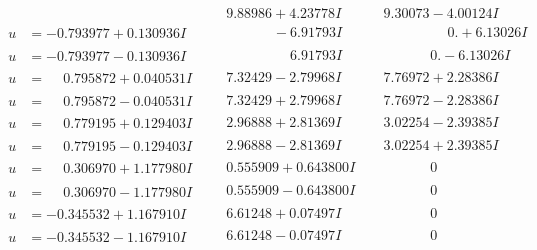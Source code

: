 \documentclass[1p]{elsarticle_modified}
\theoremstyle{definition}
\begin{document}
$$\begin{array}{c|c|c}
 & \phantom{-}9.88986 + 4.23778 I & \phantom{-}9.30073 - 4.00124 I \\ \hline\begin{aligned}
u &= -0.793977 + 0.130936 I\end{aligned}
 & \phantom{-0.000000 } -6.91793 I & \phantom{-0.000000 -}0. + 6.13026 I \\ \hline\begin{aligned}
u &= -0.793977 - 0.130936 I\end{aligned}
 & \phantom{-0.000000 -}6.91793 I & \phantom{-0.000000 } 0. - 6.13026 I \\ \hline\begin{aligned}
u &= \phantom{-}0.795872 + 0.040531 I\end{aligned}
 & \phantom{-}7.32429 - 2.79968 I & \phantom{-}7.76972 + 2.28386 I \\ \hline\begin{aligned}
u &= \phantom{-}0.795872 - 0.040531 I\end{aligned}
 & \phantom{-}7.32429 + 2.79968 I & \phantom{-}7.76972 - 2.28386 I \\ \hline\begin{aligned}
u &= \phantom{-}0.779195 + 0.129403 I\end{aligned}
 & \phantom{-}2.96888 + 2.81369 I & \phantom{-}3.02254 - 2.39385 I \\ \hline\begin{aligned}
u &= \phantom{-}0.779195 - 0.129403 I\end{aligned}
 & \phantom{-}2.96888 - 2.81369 I & \phantom{-}3.02254 + 2.39385 I \\ \hline\begin{aligned}
u &= \phantom{-}0.306970 + 1.177980 I\end{aligned}
 & \phantom{-}0.555909 + 0.643800 I & \phantom{-0.000000 } 0 \\ \hline\begin{aligned}
u &= \phantom{-}0.306970 - 1.177980 I\end{aligned}
 & \phantom{-}0.555909 - 0.643800 I & \phantom{-0.000000 } 0 \\ \hline\begin{aligned}
u &= -0.345532 + 1.167910 I\end{aligned}
 & \phantom{-}6.61248 + 0.07497 I & \phantom{-0.000000 } 0 \\ \hline\begin{aligned}
u &= -0.345532 - 1.167910 I\end{aligned}
 & \phantom{-}6.61248 - 0.07497 I & \phantom{-0.000000 } 0 \\ \hline\begin{aligned}

\end{aligned}
\end{array}$$
\end{document}
